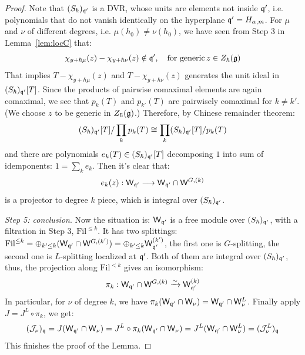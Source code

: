 \documentclass{article}
\theoremstyle{plain}
\theoremstyle{definition}
\theoremstyle{remark}
\numberwithin{equation}{section}
\begin{document}
\begin{proof}
Note that $(S_\hbar)_{\mathfrak q'}$ is a DVR, whose units are elements not inside $\mathfrak q'$, i.e. polynomials that do not vanish identically on the hyperplane $\mathfrak q' = H_{\alpha,m}$. For $\mu$ and $\nu$
of different degrees, i.e. $\mu(h_0) \neq \nu(h_0)$, we have seen from Step 3 in Lemma~\ref{lem:locC} that:
\begin{equation*}
    \chi_{y+\hbar\mu}(z) - \chi_{y+\hbar \nu}(z) \notin \mathfrak q', \quad \text{for generic} \, z\in Z_\hbar(\mathfrak{g})
\end{equation*}
That implies $T-\chi_{y+\hbar\mu} (z)$ and $T-\chi_{y+\hbar\nu} (z)$ generates the unit ideal in $(S_\hbar)_{\mathfrak q'}[T]$. Since the products of pairwise comaximal elements are again comaximal, we see that $p_k(T)$ and $p_{k'}(T)$ are pairwisely comaximal for $k\neq k'$.(We choose $z$ to be generic in $Z_\hbar(\mathfrak{g})$.) Therefore, by Chinese remainder theorem:
\begin{equation*}
    (S_\hbar)_{\mathfrak q'} [T]/\prod_k p_k(T) \cong \prod_k (S_\hbar)_{\mathfrak q'} [T]/p_k(T)
\end{equation*}
and there are polynomials $e_k (T) \in (S_\hbar)_{\mathfrak q'} [T]$ decomposing $1$ into sum of idemponents: $1 =\sum_k e_k$. Then it's clear that:
\begin{equation*}
    e_k(z) : \mathsf W_{\mathfrak q'} \longrightarrow \mathsf W_{\mathfrak q'} \cap \mathsf W^{G,(k)}
\end{equation*}
is a projector to degree $k$ piece, which is integral over $(S_\hbar)_{\mathfrak q'}$.

\emph{Step 5: conclusion}. Now the situation is: $\mathsf W_{\mathfrak q'}$ is a free module over $(S_\hbar)_{\mathfrak q'}$, with a filtration in Step 3, $\mathrm{Fil}^{\leq k}$. It has two splittings: $\mathrm{Fil}^{\leq k} = \oplus_{k' \leq k} (\mathsf W_{\mathfrak q'} \cap \mathsf W^{G,(k')}) = \oplus_{k'\leq k} \mathsf W_{\mathfrak q'}^{(k')}$, the first one is $G$-splitting, the second one is $L$-splitting localized at $\mathfrak q'$. Both of them are integral over $(S_\hbar)_{\mathfrak q'}$, thus, the projection along $\mathrm{Fil}^{<k}$ gives an isomorphism: 
\begin{equation*}
    \pi_k: \mathsf W_{\mathfrak q'} \cap \mathsf W^{G,(k)} \xrightarrow{\sim} \mathsf W_{\mathfrak q'}^{(k)}
\end{equation*}
In particular, for $\nu$ of degree $k$, we have $\pi_k (\mathsf W_{\mathfrak q'} \cap \mathsf W_\nu) = \mathsf W_{\mathfrak q'} \cap \mathsf W_\nu^L$. Finally apply $J = J^L\circ \pi_k$, we get:
\begin{equation*}
    (\mathcal J_\nu)_\mathfrak q = J(\mathsf W_{\mathfrak q'} \cap \mathsf W_\nu) = J^L\circ \pi_k (\mathsf W_{\mathfrak q'} \cap \mathsf W_\nu) = J^L (\mathsf W_{\mathfrak q'} \cap \mathsf W_\nu^L) = (\mathcal J_\nu^L)_\mathfrak q
\end{equation*}
This finishes the proof of the Lemma.
\end{proof}
\end{document}
